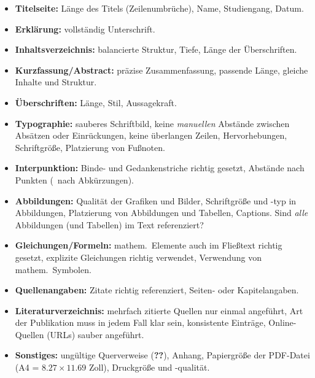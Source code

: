 \begin{itemize}
\tightlist
\item
  \textbf{Titelseite:} Länge des Titels (Zeilenumbrüche), Name,
  Studiengang, Datum.
\item
  \textbf{Erklärung:} vollständig Unterschrift.
\item
  \textbf{Inhaltsverzeichnis:} balancierte Struktur, Tiefe, Länge der
  Überschriften.
\item
  \textbf{Kurzfassung/Abstract:} präzise Zusammenfassung, passende
  Länge, gleiche Inhalte und Struktur.
\item
  \textbf{Überschriften:} Länge, Stil, Aussagekraft.
\item
  \textbf{Typographie:} sauberes Schriftbild, keine \emph{manuellen}
  Abstände zwischen Absätzen oder Einrückungen, keine überlangen Zeilen,
  Hervorhebungen, Schriftgröße, Platzierung von Fußnoten.
\item
  \textbf{Interpunktion:} Binde- und Gedankenstriche richtig gesetzt,
  Abstände nach Punkten (\va~nach Abkürzungen).
\item
  \textbf{Abbildungen:} Qualität der Grafiken und Bilder, Schriftgröße
  und -typ in Abbildungen, Platzierung von Abbildungen und Tabellen,
  Captions. Sind \emph{alle} Abbildungen (und Tabellen) im Text
  referenziert?
\item
  \textbf{Gleichungen/Formeln:} mathem.~Elemente auch im Fließtext
  richtig gesetzt, explizite Gleichungen richtig verwendet, Verwendung
  von mathem.~Symbolen.
\item
  \textbf{Quellenangaben:} Zitate richtig referenziert, Seiten- oder
  Kapitelangaben.
\item
  \textbf{Literaturverzeichnis:} mehrfach zitierte Quellen nur einmal
  angeführt, Art der Publikation muss in jedem Fall klar sein,
  konsistente Einträge, Online-Quellen (URLs) sauber angeführt.
\item
  \textbf{Sonstiges:} ungültige Querverweise (\textbf{??}), Anhang,
  Papiergröße der PDF-Datei (A4 = \(8.27 \times 11.69\) Zoll),
  Druckgröße und -qualität.
\end{itemize}
